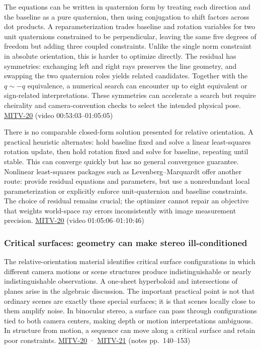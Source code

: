 The equations can be written in quaternion form by treating each direction and the baseline as a pure quaternion, then using conjugation to shift factors across dot products. A reparameterization trades baseline and rotation variables for two unit quaternions constrained to be perpendicular, leaving the same five degrees of freedom but adding three coupled constraints. Unlike the single norm constraint in absolute orientation, this is harder to optimize directly. The residual has symmetries: exchanging left and right rays preserves the line geometry, and swapping the two quaternion roles yields related candidates. Together with the \(q\sim -q\) equivalence, a numerical search can encounter up to eight equivalent or sign-related interpretations. These symmetries can accelerate a search but require cheirality and camera-convention checks to select the intended physical pose. \hyperref[04-visual-computing-ii-ch036]{MITV-20} (video 00:53:03--01:05:05)

There is no comparable closed-form solution presented for relative orientation. A practical heuristic alternates: hold baseline fixed and solve a linear least-squares rotation update, then hold rotation fixed and solve for baseline, repeating until stable. This can converge quickly but has no general convergence guarantee. Nonlinear least-squares packages such as Levenberg--Marquardt offer another route: provide residual equations and parameters, but use a nonredundant local parameterization or explicitly enforce unit-quaternion and baseline constraints. The choice of residual remains crucial; the optimizer cannot repair an objective that weights world-space ray errors inconsistently with image measurement precision. \hyperref[04-visual-computing-ii-ch036]{MITV-20} (video 01:05:06--01:10:46)

\subsubsection{Critical surfaces: geometry can make stereo ill-conditioned}\label{critical-surfaces-geometry-can-make-stereo-ill-conditioned}

The relative-orientation material identifies critical surface configurations in which different camera motions or scene structures produce indistinguishable or nearly indistinguishable observations. A one-sheet hyperboloid and intersections of planes arise in the algebraic discussion. The important practical point is not that ordinary scenes are exactly these special surfaces; it is that scenes locally close to them amplify noise. In binocular stereo, a surface can pass through configurations tied to both camera centers, making depth or motion interpretations ambiguous. In structure from motion, a sequence can move along a critical surface and retain poor constraints. \hyperref[04-visual-computing-ii-ch036]{MITV-20} · \hyperref[04-visual-computing-ii-ch036]{MITV-21} (notes pp.~140--153)

